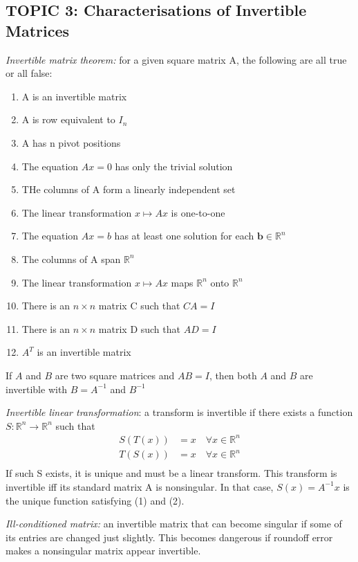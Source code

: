 \documentclass[12pt]{article} %
\newcommand{\R}{\mathbb{R}}
\begin{document}
\pagebreak
\subsection{TOPIC 3: Characterisations of Invertible Matrices}

\emph{Invertible matrix theorem:} for a given square matrix A, the following are all true or all false:
\begin{enumerate}
	\item A is an invertible matrix
	\item A is row equivalent to $I_n$
	\item A has n pivot positions
	\item The equation $Ax = 0$ has only the trivial solution
	\item THe columns of A form a linearly independent set
	\item The linear transformation $x \mapsto Ax$ is one-to-one
	\item The equation $Ax = b$ has at least one solution for each $\mathbf{b} \in \R^n$
	\item The columns of A span $\R^n$
	\item The linear transformation $x \mapsto Ax$ maps $\R^n$ onto $\R^n$
	\item There is an $n \times n$ matrix C such that $CA = I$
	\item There is an $n \times n$ matrix D such that $AD = I$ 
	\item $A^T$ is an invertible matrix
\end{enumerate}

If $A$ and $B$ are two square matrices and $AB = I$, then both $A$ and $B$ are invertible with $B = A^{-1}$ and $B^{-1}$

\emph{Invertible linear transformation}: a transform is invertible if there exists a function $S: \R^n \to \R^n$ such that 
\begin{align}
	S(T(x)) &= x \quad \forall x \in \R^n\\
	T(S(x)) &= x \quad \forall x \in \R^n\\
\end{align}
If such S exists, it is unique and must be a linear transform. This transform is invertible iff its standard matrix A is nonsingular. In that case, $S(x) = A^{-1}x$ is the unique function satisfying (1) and (2).

\emph{Ill-conditioned matrix:} an invertible matrix that can become singular if some of its entries are changed just slightly. This becomes dangerous if roundoff error makes a nonsingular matrix appear invertible.
\end{document}

